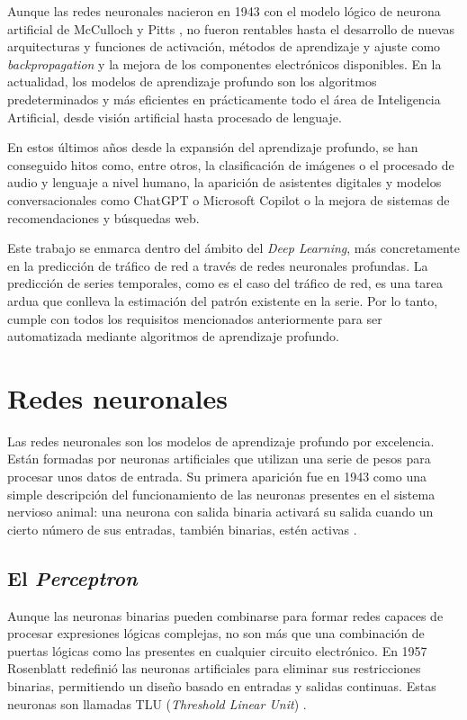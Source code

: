 Aunque las redes neuronales nacieron en 1943 con el modelo lógico de neurona artificial de McCulloch y Pitts \cite{mcculloch1943}, no fueron rentables hasta el desarrollo de nuevas arquitecturas y funciones de activación, métodos de aprendizaje y ajuste como \textit{backpropagation} \cite{rumelhart1985} y la mejora de los componentes electrónicos disponibles. En la actualidad, los modelos de aprendizaje profundo son los algoritmos predeterminados y más eficientes en prácticamente todo el área de Inteligencia Artificial, desde visión artificial hasta procesado de lenguaje.

En estos últimos años desde la expansión del aprendizaje profundo, se han conseguido hitos como, entre otros, la clasificación de imágenes o el procesado de audio y lenguaje a nivel humano, la aparición de asistentes digitales y modelos conversacionales como ChatGPT o Microsoft Copilot o la mejora de sistemas de recomendaciones y búsquedas web.

Este trabajo se enmarca dentro del ámbito del \textit{Deep Learning}, más concretamente en la predicción de tráfico de red a través de redes neuronales profundas. La predicción de series temporales, como es el caso del tráfico de red, es una tarea ardua que conlleva la estimación del patrón existente en la serie. Por lo tanto, cumple con todos los requisitos mencionados anteriormente para ser automatizada mediante algoritmos de aprendizaje profundo. 




\chapter{Redes neuronales}
\label{cap4:redes}
Las redes neuronales son los modelos de aprendizaje profundo por excelencia. Están formadas por neuronas artificiales que utilizan una serie de pesos para procesar unos datos de entrada. Su primera aparición fue en 1943 como una simple descripción del funcionamiento de las neuronas presentes en el sistema nervioso animal: una neurona con salida binaria activará su salida cuando un cierto número de sus entradas, también binarias, estén activas \cite{mcculloch1943}.

\section{El \textit{Perceptron}}

Aunque las neuronas binarias pueden combinarse para formar redes capaces de procesar expresiones lógicas complejas, no son más que una combinación de puertas lógicas como las presentes en cualquier circuito electrónico. En 1957 Rosenblatt redefinió las neuronas artificiales para eliminar sus restricciones binarias, permitiendo un diseño basado en entradas y salidas continuas. Estas neuronas son llamadas TLU (\textit{Threshold Linear Unit}) \cite{rosenblatt1957, machinelearningbook}.

